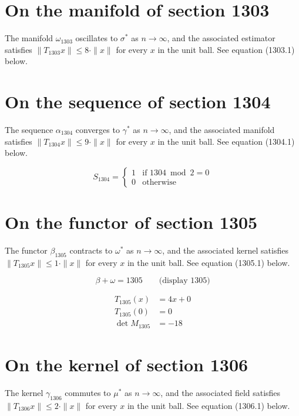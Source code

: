 \documentclass{article}
\begin{document}
\section{On the manifold of section 1303}
The manifold $\omega_{1303}$ oscillates to $\sigma^{*}$ as $n \to \infty$,
and the associated estimator satisfies $\|T_{1303} x\| \leq 8 \cdot \|x\|$
for every $x$ in the unit ball. See equation (1303.1) below.

\section{On the sequence of section 1304}
The sequence $\alpha_{1304}$ converges to $\gamma^{*}$ as $n \to \infty$,
and the associated manifold satisfies $\|T_{1304} x\| \leq 9 \cdot \|x\|$
for every $x$ in the unit ball. See equation (1304.1) below.

\begin{equation}
S_{1304} = \begin{cases} 1 & \text{if } 1304 \bmod 2 = 0 \\ 0 & \text{otherwise} \end{cases}
\end{equation}

\section{On the functor of section 1305}
The functor $\beta_{1305}$ contracts to $\omega^{*}$ as $n \to \infty$,
and the associated kernel satisfies $\|T_{1305} x\| \leq 1 \cdot \|x\|$
for every $x$ in the unit ball. See equation (1305.1) below.

$$
\beta + \omega = 1305 \qquad \text{(display 1305)}
$$

\begin{align}
T_{1305}(x) &= 4 x + 0 \\
T_{1305}(0) &= 0 \\
\det M_{1305} &= -18
\end{align}

\section{On the kernel of section 1306}
The kernel $\gamma_{1306}$ commutes to $\mu^{*}$ as $n \to \infty$,
and the associated field satisfies $\|T_{1306} x\| \leq 2 \cdot \|x\|$
for every $x$ in the unit ball. See equation (1306.1) below.
\end{document}
